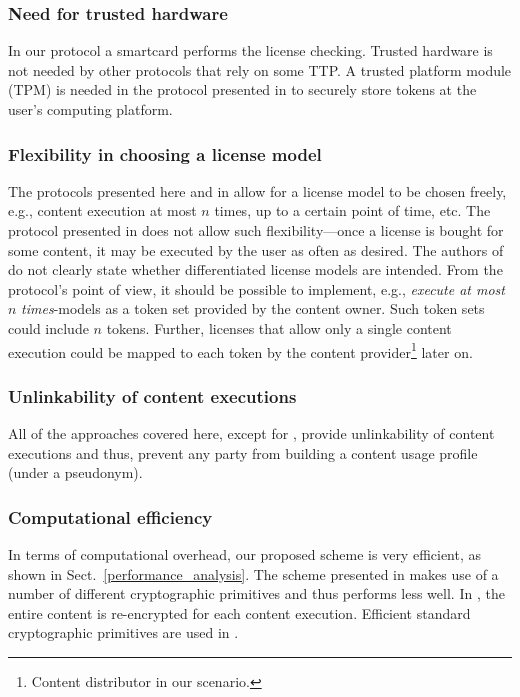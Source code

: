 \documentclass{llncs}
\newcommand{\refSec}[1]{Sect.~\ref{#1}}
\begin{document}
\subsubsection{Need for trusted hardware}

In our protocol a smartcard performs the license checking. Trusted hardware is not needed by other protocols that rely on some TTP. A trusted platform module (TPM) is needed in the protocol presented in \cite{nottp} to securely store tokens at the user's computing platform. 

\subsubsection{Flexibility in choosing a license model}

The protocols presented here and in \cite{proxy, practical} allow for a license model to be chosen freely, e.g., content execution at most $n$ times, up to a certain point of time, etc. The protocol presented in \cite{multilevel} does not allow such flexibility---once a license is bought for some content, it may be executed by the user as often as desired. The authors of \cite{nottp} do not clearly state whether differentiated license models are intended. From the protocol's point of view, it should be possible to implement, e.g., \emph{execute at most} $n$ \emph{times}-models as a token set provided by the content owner. Such token sets could include $n$ tokens. Further, licenses that allow only a single content execution could be mapped to each token by the content provider\footnote{Content distributor in our scenario.} later on.

\subsubsection{Unlinkability of content executions}

All of the approaches covered here, except for \cite{nottp}, provide unlinkability of content executions and thus, prevent any party from building a content usage profile (under a pseudonym).



\subsubsection{Computational efficiency}

In terms of computational overhead, our proposed scheme is very efficient, as shown in \refSec{performance_analysis}. The scheme presented in \cite{practical} makes use of a number of different cryptographic primitives and thus performs less well. In \cite{proxy}, the entire content is re-encrypted for each content execution. Efficient standard cryptographic primitives are used in \cite{multilevel, nottp}. 
\end{document}
